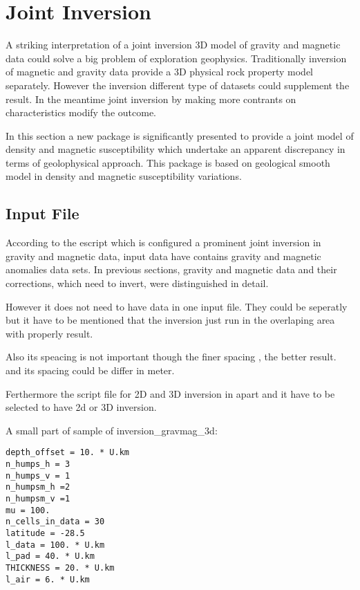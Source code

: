 \chapter{Joint Inversion}\label{Chp:cook:joint inversion}


A striking interpretation of a joint inversion 3D model of gravity and magnetic data could solve a big problem of exploration geophysics. Traditionally inversion of magnetic and gravity data provide a 3D physical rock property model separately. However the inversion different type of datasets could supplement the result. In the meantime joint inversion by making more contrants on characteristics modify the outcome.

In this section a new package is significantly presented to provide a joint model of density and magnetic susceptibility which undertake an apparent discrepancy in terms of geolophysical approach. This package is based on geological smooth model in density and magnetic susceptibility variations.



\section{Input File} 

According to the escript which is configured a prominent joint inversion in gravity and magnetic data, input data have contains gravity and magnetic anomalies data sets. In previous sections, gravity and magnetic data and their corrections, which need to invert, were distinguished in detail.

However it does not need to have data in one input file. They could be seperatly but it have to be mentioned that the inversion just run in the overlaping area with properly result.

Also its speacing is not important though the finer spacing , the better result. and its spacing could be differ in meter. 

Ferthermore the script file for 2D and 3D inversion in apart and it have to be selected to have 2d or 3D inversion.

A small part of sample of inversion_gravmag_3d:

\begin{verbatim}
depth_offset = 10. * U.km
n_humps_h = 3
n_humps_v = 1
n_humpsm_h =2
n_humpsm_v =1
mu = 100.
n_cells_in_data = 30
latitude = -28.5
l_data = 100. * U.km
l_pad = 40. * U.km
THICKNESS = 20. * U.km
l_air = 6. * U.km
\end{verbatim}

